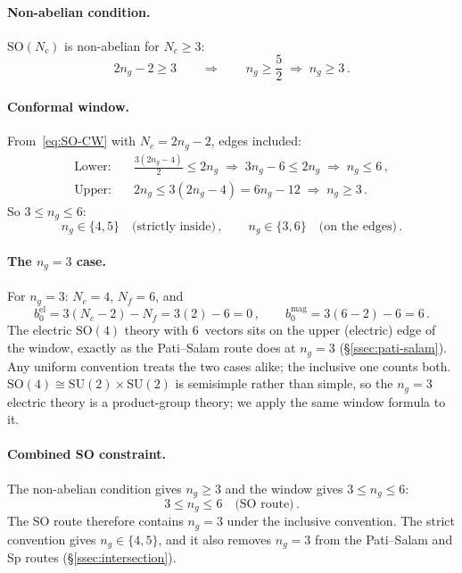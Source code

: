 \documentclass[11pt,a4paper]{article}
\theoremstyle{plain}
\theoremstyle{definition}
\theoremstyle{remark}
\newcommand{\Nc}{N_{\!c}}
\newcommand{\Nf}{N_{\!f}}
\newcommand{\ngen}{n_g}
\newcommand{\SU}[1]{\mathrm{SU}(#1)}
\newcommand{\SO}[1]{\mathrm{SO}(#1)}
\begin{document}
\paragraph{Non-abelian condition.}
$\SO{\Nc}$ is non-abelian for $\Nc \geq 3$:
\begin{equation}\label{eq:SO-bound}
  2\ngen - 2 \geq 3
  \qquad\Longrightarrow\qquad
  \boxed{\ngen \geq \frac{5}{2} \;\Longrightarrow\; \ngen \geq 3}\,.
\end{equation}

\paragraph{Conformal window.}
From~\eqref{eq:SO-CW} with $\Nc = 2\ngen - 2$, edges included:
\begin{align}
  \text{Lower:}&\quad \frac{3(2\ngen - 4)}{2} \leq 2\ngen
  \;\Longrightarrow\;
  3\ngen - 6 \leq 2\ngen
  \;\Longrightarrow\;
  \ngen \leq 6\,,
  \label{eq:SO-CW-lower} \\
  \text{Upper:}&\quad 2\ngen \leq 3(2\ngen - 4) = 6\ngen - 12
  \;\Longrightarrow\;
  \ngen \geq 3\,.
  \label{eq:SO-CW-upper}
\end{align}
So $3 \leq \ngen \leq 6$:
\begin{equation}\label{eq:SO-CW-ng}
  \ngen \in \{4, 5\} \quad\text{(strictly inside)}\,,
  \qquad
  \ngen \in \{3, 6\} \quad\text{(on the edges)}\,.
\end{equation}

\paragraph{The $\ngen = 3$ case.}
For $\ngen = 3$: $\Nc = 4$, $\Nf = 6$, and
\begin{equation}
  b_0^{\mathrm{el}} = 3(\Nc - 2) - \Nf = 3(2) - 6 = 0\,,
  \qquad
  b_0^{\mathrm{mag}} = 3(6 - 2) - 6 = 6\,.
\end{equation}
The electric $\SO{4}$ theory with 6~vectors sits on the upper (electric)
edge of the window, exactly as the Pati--Salam route does at $\ngen = 3$
(\S\ref{ssec:pati-salam}).  Any uniform convention treats the two cases
alike; the inclusive one counts both.  $\SO{4} \cong \SU{2} \times \SU{2}$
is semisimple rather than simple, so the $\ngen = 3$ electric theory is a
product-group theory; we apply the same window formula to it.

\paragraph{Combined SO constraint.}
The non-abelian condition gives $\ngen \geq 3$ and the window gives
$3 \leq \ngen \leq 6$:
\begin{equation}\label{eq:SO-combined}
  \boxed{3 \leq \ngen \leq 6 \quad\text{(SO route)}}\,.
\end{equation}
The SO route therefore contains $\ngen = 3$ under the inclusive
convention.  The strict convention gives $\ngen \in \{4, 5\}$, and it
also removes $\ngen = 3$ from the Pati--Salam and Sp routes
(\S\ref{ssec:intersection}).
\end{document}
